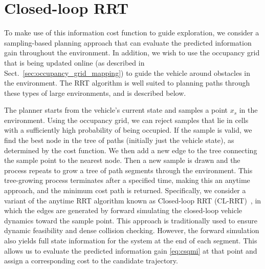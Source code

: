 \section{Closed-loop RRT}
\label{sec:planner}

To make use of this information cost function to guide exploration, we consider a sampling-based planning approach that can evaluate the predicted information gain throughout the environment. In addition, we wish to use the occupancy grid that is being updated online (as described in Sect.~\ref{sec:occupancy_grid_mapping}) to guide the vehicle around obstacles in the environment. The RRT algorithm is well suited to planning paths through these types of large environments, and is described below. 

The planner starts from the vehicle's current state and samples a point $x_s$ in the environment. Using the occupancy grid, we can reject samples that lie in cells with a sufficiently high probability of being occupied. If the sample is valid, we find the best node in the tree of paths (initially just the vehicle state), as determined by the cost function. We then add a new edge to the tree connecting the sample point to the nearest node.
Then a new sample is drawn and the process repeats to grow a tree of path segments through the environment. This tree-growing process terminates after a specified time, making this an anytime approach, and the minimum cost path is returned. Specifically, we consider a variant of the anytime RRT algorithm known as Closed-loop RRT (CL-RRT)~\cite{Kuwata09_TCST}, in which the edges are generated by forward simulating the closed-loop vehicle dynamics toward the sample point. This approach is traditionally used to ensure dynamic feasibility and dense collision checking. However, the forward simulation also yields full state information for the system at the end of each segment. This allows us to evaluate the predicted information gain \eqref{eq:csqmi} at that point and assign a corresponding cost to the candidate trajectory.

